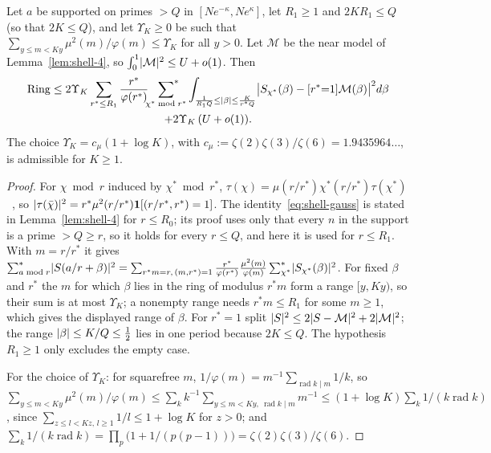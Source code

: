 \begin{lemma}\label{lem:shell-star}
Let $a$ be supported on primes $>Q$ in $[Ne^{-\kappa},Ne^\kappa]$, let $R_1\ge1$ and $2KR_1\le Q$ (so that $2K\le Q$), and let $\Upsilon_K\ge0$ be such that
$\sum_{y\le m<Ky}\mu^2(m)/\varphi(m)\le\Upsilon_K$ for all $y>0$. Let $\mathcal M$ be the near model of Lemma~\ref{lem:shell-4}, so $\int_0^1\lvert \mathcal M\rvert^2\le U+o(1)$. Then
\begin{multline*}
\mathrm{Ring}\le2\Upsilon_K\sum_{r^*\le R_1}\frac{r^*}{\varphi(r^*)}\sideset{}{^*}\sum_{\chi^*\bmod r^*}
\int_{\frac1{R_1Q}\le\lvert \beta\rvert\le\frac K{r^*Q}}\bigl|S_{\chi^*}(\beta)-[r^*{=}1]\mathcal M(\beta)\bigr|^2d\beta\\
+2\Upsilon_K\,(U+o(1)) .
\end{multline*}
The choice $\Upsilon_K=c_\mu(1+\log K)$, with $c_\mu:=\zeta(2)\zeta(3)/\zeta(6)=1.9435964\ldots$, is admissible for $K\ge1$.
\end{lemma}
\begin{proof}
For $\chi\bmod r$ induced by $\chi^*\bmod r^*$, $\tau(\chi)=\mu(r/r^*)\chi^*(r/r^*)\tau(\chi^*)$~\cite[Thm.~9.10]{MV}, so
$\lvert \tau(\bar\chi)\rvert^2=r^*\mu^2(r/r^*)\mathbf 1[(r/r^*,r^*)=1]$. The identity~\eqref{eq:shell-gauss} is stated in Lemma~\ref{lem:shell-4} for $r\le R_0$; its proof
uses only that every $n$ in the support is a prime $>Q\ge r$, so it holds for every $r\le Q$, and here it is used for $r\le R_1$. With $m=r/r^*$ it gives
$\sum^*_{a\bmod r}\lvert S(a/r+\beta)\rvert^2=\sum_{r^*m=r,\,(m,r^*)=1}\frac{r^*}{\varphi(r^*)}\frac{\mu^2(m)}{\varphi(m)}\sum^*_{\chi^*}\lvert S_{\chi^*}(\beta)\rvert^2$. For fixed $\beta$ and $r^*$ the $m$
for which $\beta$ lies in the ring of modulus $r^*m$ form a range $[y,Ky)$, so their sum is at most $\Upsilon_K$; a nonempty range needs $r^*m\le R_1$ for some
$m\ge1$, which gives the displayed range of $\beta$. For $r^*=1$ split $\lvert S\rvert^2\le2\lvert S-\mathcal M\rvert^2+2\lvert \mathcal M\rvert^2$; the range $\lvert \beta\rvert\le K/Q\le\frac12$ lies in
one period because $2K\le Q$. The hypothesis $R_1\ge1$ only excludes the empty case.

For the choice of $\Upsilon_K$: for squarefree $m$, $1/\varphi(m)=m^{-1}\sum_{\operatorname{rad}k\mid m}1/k$, so
$\sum_{y\le m<Ky}\mu^2(m)/\varphi(m)\le\sum_kk^{-1}\sum_{y\le m<Ky,\ \operatorname{rad}k\mid m}m^{-1}\le(1+\log K)\sum_k1/(k\operatorname{rad}k)$, since
$\sum_{z\le l<Kz,\,l\ge1}1/l\le1+\log K$ for $z>0$; and $\sum_k1/(k\operatorname{rad}k)=\prod_p\bigl(1+1/(p(p-1))\bigr)=\zeta(2)\zeta(3)/\zeta(6)$.
\end{proof}

